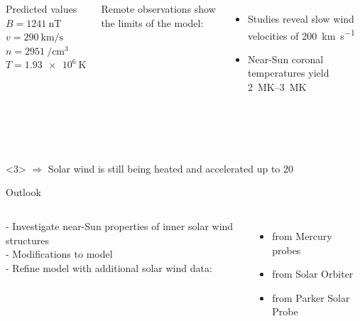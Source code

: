\begin{frame}[c]{}{}
	\begin{columns}[c]
		
		\begin{block}{Predicted values}
			$B = \SI{1241}{\nano\tesla}$\\
			$v = \SI{290}{\km\per\s}$\\
			$n = \SI{2951}{\per\cm\cubed}$\\
			$T = \SI{1.93e6}{\kelvin}$
		\end{block}


		Remote observations show the limits of the model:
		\begin{itemize}%
			\item Studies reveal slow wind velocities of \SI{200}{\km\per\s} \citep{Sheeley1997,Wang2000}\\
			\item Near-Sun coronal temperatures yield \SIrange{2}{3}{\mega\kelvin} \citep{Billings1959,Liebenberg1975}\\
		\end{itemize}
		
	\end{columns}
	
	\ \\\ 
	\begin{block}<3>{}
		\centering $\Rightarrow$ Solar wind is still being heated and accelerated up to 20\,\Rs{}
	\end{block}
	
\end{frame}
\begin{frame}[c]{Outlook}{}
	\begin{columns}[c]

		- Investigate near-Sun properties of inner solar wind structures\\
		- Modifications to model\\
		- Refine model with additional solar wind data:
		\begin{itemize}
			\item from Mercury probes
			\item from Solar Orbiter
			\item from Parker Solar Probe
		\end{itemize}
		
		
		
		
	\end{columns}
\end{frame}


